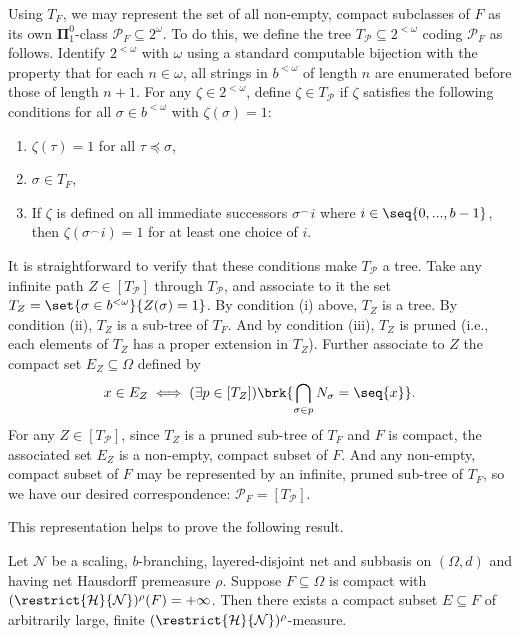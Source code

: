 Using $T_F$, we may represent the set of all non-empty, compact subclasses of $F$ as its own $\boldsymbol{\Pi}^0_1$-class $\mathcal{P}_F \subseteq 2^{\omega}$. To do this, we define the tree $T_{\mathcal{P}} \subseteq 2^{<\omega}$ coding $\mathcal{P}_F$ as follows. Identify $2^{<\omega}$ with $\omega$ using a standard computable bijection with the property that for each $n \in \omega$, all strings in $b^{<\omega}$ of length $n$ are enumerated before those of length $n + 1$. For any $\zeta \in 2^{<\omega}$, define $\zeta \in T_{\mathcal{P}}$ if $\zeta$ satisfies the following conditions for all $\sigma \in b^{<\omega}$ with $\zeta(\sigma) = 1$:
\begin{enumerate}[label = (\roman*)]
    \item $\zeta(\tau) = 1$ for all $\tau \preceq \sigma$,
    \item $\sigma \in T_F$,
    \item If $\zeta$ is defined on all immediate successors $\sigma^\smallfrown i$ where $i \in \seq{0, ..., b - 1}$, then $\zeta(\sigma^\smallfrown i) = 1$ for at least one choice of $i$.
\end{enumerate}

It is straightforward to verify that these conditions make $T_{\mathcal{P}}$ a tree. Take any infinite path $Z \in [T_{\mathcal{P}}]$ through $T_{\mathcal{P}}$, and associate to it the set $T_Z = \set{\sigma \in b^{<\omega}}{Z(\sigma) = 1}$. By condition (i) above, $T_Z$ is a tree. By condition (ii), $T_Z$ is a sub-tree of $T_F$. And by condition (iii), $T_Z$ is pruned (i.e., each elements of $T_Z$ has a proper extension in $T_Z$). Further associate to $Z$ the compact set $E_Z \subseteq \Omega$ defined by
\begin{align*}
    x \in E_Z \iff (\exists p \in [T_Z]) \brk{\bigcap_{\sigma \in p} N_\sigma = \seq{x}}.
\end{align*}
For any $Z \in [T_{\mathcal{P}}]$, since $T_Z$ is a pruned sub-tree of $T_F$ and $F$ is compact, the associated set $E_Z$ is a non-empty, compact subset of $F$. And any non-empty, compact subset of $F$ may be represented by an infinite, pruned sub-tree of $T_F$, so we have our desired correspondence: $\mathcal{P}_F = [T_{\mathcal{P}}]$. 

This representation helps to prove the following result.

\begin{theorem}
    \label{theorem:existence_of_compact_subset_exact_for_premeasure}
    Let $\mathcal{N}$ be a scaling, $b$-branching, layered-disjoint net and subbasis on $(\Omega, d)$ and having net Hausdorff premeasure $\rho$. Suppose $F \subseteq \Omega$ is compact with $(\restrict{\mathcal{H}}{\mathcal{N}})^\rho(F) = +\infty$. Then there exists a compact subset $E \subseteq F$ of arbitrarily large, finite $(\restrict{\mathcal{H}}{\mathcal{N}})^\rho$-measure.
\end{theorem}

